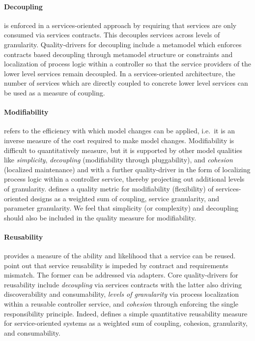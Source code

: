 \paragraph{Decoupling} is enforced in a services-oriented approach by requiring that services are only consumed via services contracts. This decouples services across levels of granularity. Quality-drivers for decoupling include a metamodel which enforces contracts based decoupling through metamodel structure or constraints and localization of process logic within a controller so that the service providers of the lower level services remain decoupled. In a services-oriented architecture, the number of services which are directly coupled to concrete lower level services can be used as a measure of coupling\cite{shim_design_2008}.

\paragraph{Modifiability} refers to the efficiency with which model changes can be applied, i.e.\ it is an inverse measure of the cost required to make model changes. Modifiability is difficult to quantitatively measure, but it is supported by other model qualities like \emph{simplicity},  \emph{decoupling} (modifiability through pluggability), and \emph{cohesion} (localized maintenance) and with a further quality-driver in the form of localizing process logic within a controller service, thereby projecting out additional levels of granularity. \cite{shim_design_2008} defines a quality metric for modifiability (flexibility) of services-oriented designs as a weighted sum of coupling, service granularity, and parameter granularity. We feel that simplicity (or complexity) and decoupling should also be included in the quality measure for modifiability.

\paragraph{Reusability} provides a measure of the ability and likelihood that a service can be reused.  \cite{khoshkbarforoushha_metric_2010,choi_quality_2008,feuerlicht_determinants_2007}
\cite{khoshkbarforoushha_metric_2010} point out that service reusability is impeded by contract and requirements mismatch. The former can be addressed via adapters. Core quality-drivers for reusability include \emph{decoupling} via services contracts with the latter also driving discoverability and consumability, \emph{levels of granularity} via process localization within a reusable controller service, and \emph{cohesion} through enforcing the single responsibility principle. Indeed, \cite{shim_design_2008} defines a simple quantitative reusability measure for service-oriented systems as a weighted sum of coupling, cohesion, granularity, and consumability.

